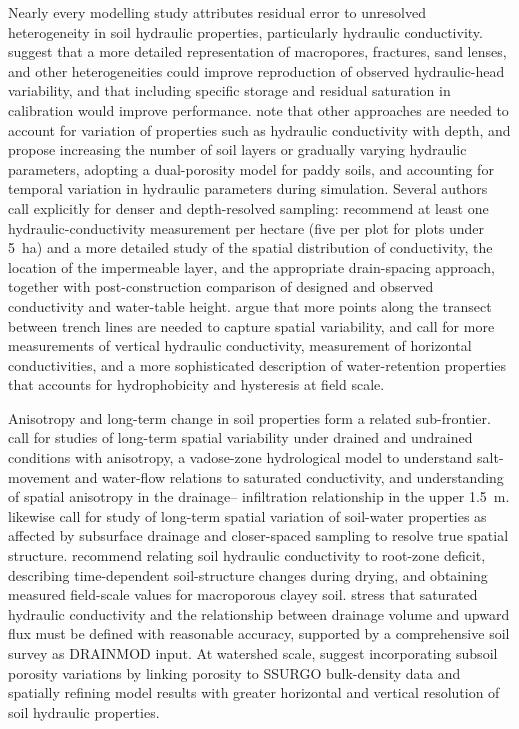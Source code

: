 \documentclass[11pt]{article}
\begin{document}
Nearly every modelling study attributes residual error to unresolved
heterogeneity in soil hydraulic properties, particularly hydraulic
conductivity. \textcite{DeSchepper2017} suggest that a more detailed
representation of macropores, fractures, sand lenses, and other
heterogeneities could improve reproduction of observed hydraulic-head
variability, and that including specific storage and residual saturation in
calibration would improve performance. \textcite{Wesström2003} note that other
approaches are needed to account for variation of properties such as hydraulic
conductivity with depth, and \textcite{Karandish2018} propose increasing the
number of soil layers or gradually varying hydraulic parameters, adopting a
dual-porosity model for paddy soils, and accounting for temporal variation in
hydraulic parameters during simulation. Several authors call explicitly for
denser and depth-resolved sampling: \textcite{PalaciosVélez2004} recommend at
least one hydraulic-conductivity measurement per hectare (five per plot for
plots under 5~ha) and a more detailed study of the spatial distribution of
conductivity, the location of the impermeable layer, and the appropriate
drain-spacing approach, together with post-construction comparison of designed
and observed conductivity and water-table height. \textcite{Messing2006} argue
that more points along the transect between trench lines are needed to capture
spatial variability, and \textcite{Tähtikarhu2025} call for more measurements
of vertical hydraulic conductivity, measurement of horizontal conductivities,
and a more sophisticated description of water-retention properties that
accounts for hydrophobicity and hysteresis at field scale.

Anisotropy and long-term change in soil properties form a related sub-frontier.
\textcite{Akis2015} call for studies of long-term spatial variability under
drained and undrained conditions with anisotropy, a vadose-zone hydrological
model to understand salt-movement and water-flow relations to saturated
conductivity, and understanding of spatial anisotropy in the drainage--
infiltration relationship in the upper 1.5~m. \textcite{Moustafa1998} likewise
call for study of long-term spatial variation of soil-water properties as
affected by subsurface drainage and closer-spaced sampling to resolve true
spatial structure. \textcite{Koivusalo1999} recommend relating soil hydraulic
conductivity to root-zone deficit, describing time-dependent soil-structure
changes during drying, and obtaining measured field-scale values for
macroporous clayey soil. \textcite{DeBoer2006} stress that saturated hydraulic
conductivity and the relationship between drainage volume and upward flux must
be defined with reasonable accuracy, supported by a comprehensive soil survey
as DRAINMOD input. At watershed scale, \textcite{Schilling2015} suggest
incorporating subsoil porosity variations by linking porosity to SSURGO
bulk-density data and spatially refining model results with greater horizontal
and vertical resolution of soil hydraulic properties.
\end{document}
